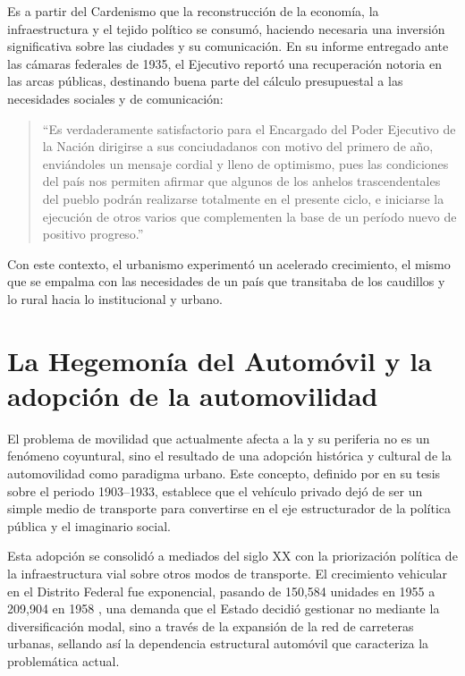 Es a partir del Cardenismo que la reconstrucción de la economía, la infraestructura
y el tejido político se consumó, haciendo necesaria una inversión significativa sobre
las ciudades y su comunicación. En su informe entregado ante las cámaras federales
de 1935, el Ejecutivo reportó una recuperación notoria en las arcas públicas,
destinando buena parte del cálculo presupuestal a las necesidades sociales y de
comunicación:

\begin{quote}
``Es verdaderamente satisfactorio para el Encargado del Poder Ejecutivo de la
Nación dirigirse a sus conciudadanos con motivo del primero de año, enviándoles un
mensaje cordial y lleno de optimismo, pues las condiciones del país nos permiten
afirmar que algunos de los anhelos trascendentales del pueblo podrán realizarse
totalmente en el presente ciclo, e iniciarse la ejecución de otros varios que
complementen la base de un período nuevo de positivo progreso.''
\parencite[pp.~2--4]{biblioteca1935}
\end{quote}

Con este contexto, el urbanismo experimentó un acelerado crecimiento, el mismo
que se empalma con las necesidades de un país que transitaba de los caudillos y lo
rural hacia lo institucional y urbano.

\section{La Hegemonía del Automóvil y la adopción de la automovilidad}
\label{sec:hegemonia-automovil}

El problema de movilidad que actualmente afecta a la \cdmx{} y su periferia no es
un fenómeno coyuntural, sino el resultado de una adopción histórica y cultural de la
automovilidad como paradigma urbano. Este concepto, definido por
\textcite{franco2022} en su tesis sobre el periodo 1903--1933, establece que el
vehículo privado dejó de ser un simple medio de transporte para convertirse en el
eje estructurador de la política pública y el imaginario social.

Esta adopción se consolidó a mediados del siglo XX con la priorización política de
la infraestructura vial sobre otros modos de transporte. El crecimiento vehicular en
el Distrito Federal fue exponencial, pasando de 150,584 unidades en 1955 a
209,904 en 1958 \parencite{perlo2023}, una demanda que el Estado decidió gestionar
no mediante la diversificación modal, sino a través de la expansión de la red de
carreteras urbanas, sellando así la dependencia estructural \DIFdelbegin {}\DIFdelend \DIFaddbegin {}\DIFaddend automóvil que
caracteriza la problemática actual.

